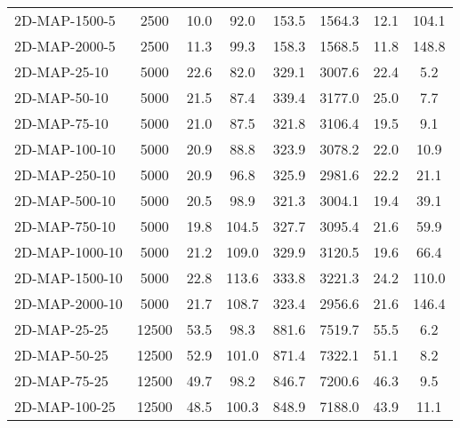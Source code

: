 \documentclass{article}
\begin{document}
\begin{table}[h]
\begin{center}
\begin{tabular}{|l||c|c|c|c|c|c|c|}
            2D-MAP-1500-5                  & 2500  & 10.0      & 92.0       & 153.5       & 1564.3   & 12.1      & 104.1      \\
            2D-MAP-2000-5                  & 2500  & 11.3      & 99.3       & 158.3       & 1568.5   & 11.8      & 148.8      \\
            \hline
            2D-MAP-25-10                   & 5000  & 22.6      & 82.0       & 329.1       & 3007.6   & 22.4      & 5.2        \\
            2D-MAP-50-10                   & 5000  & 21.5      & 87.4       & 339.4       & 3177.0   & 25.0      & 7.7        \\
            2D-MAP-75-10                   & 5000  & 21.0      & 87.5       & 321.8       & 3106.4   & 19.5      & 9.1        \\
            2D-MAP-100-10                  & 5000  & 20.9      & 88.8       & 323.9       & 3078.2   & 22.0      & 10.9       \\
            2D-MAP-250-10                  & 5000  & 20.9      & 96.8       & 325.9       & 2981.6   & 22.2      & 21.1       \\
            2D-MAP-500-10                  & 5000  & 20.5      & 98.9       & 321.3       & 3004.1   & 19.4      & 39.1       \\
            2D-MAP-750-10                  & 5000  & 19.8      & 104.5      & 327.7       & 3095.4   & 21.6      & 59.9       \\
            2D-MAP-1000-10                 & 5000  & 21.2      & 109.0      & 329.9       & 3120.5   & 19.6      & 66.4       \\
            2D-MAP-1500-10                 & 5000  & 22.8      & 113.6      & 333.8       & 3221.3   & 24.2      & 110.0      \\
            2D-MAP-2000-10                 & 5000  & 21.7      & 108.7      & 323.4       & 2956.6   & 21.6      & 146.4      \\
            \hline
            2D-MAP-25-25                   & 12500 & 53.5      & 98.3       & 881.6       & 7519.7   & 55.5      & 6.2        \\
            2D-MAP-50-25                   & 12500 & 52.9      & 101.0      & 871.4       & 7322.1   & 51.1      & 8.2        \\
            2D-MAP-75-25                   & 12500 & 49.7      & 98.2       & 846.7       & 7200.6   & 46.3      & 9.5        \\
            2D-MAP-100-25                  & 12500 & 48.5      & 100.3      & 848.9       & 7188.0   & 43.9      & 11.1       \\

\end{tabular}
\end{center}
\end{table}
\end{document}
